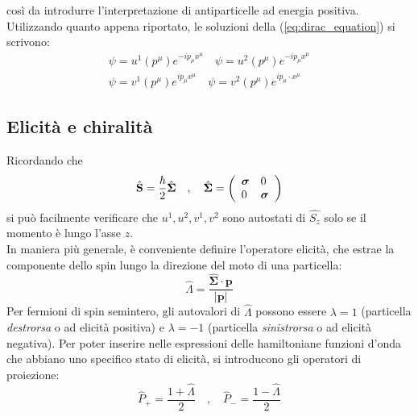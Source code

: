 \documentclass{subnucbo}
\begin{document}
così da introdurre l'interpretazione di antiparticelle ad energia positiva. Utilizzando quanto appena riportato, le soluzioni della (\ref{eq:dirac_equation}) si scrivono:
\begin{equation}
        \begin{align}
                \psi = u ^ { 1 } \left( p ^ { \mu } \right) e ^ { - i p_{\mu} x^{\mu} } \quad \psi = u ^ { 2 } \left( p ^ { \mu } \right) e ^ { - i p_{\mu} x^{\mu} } \\ \psi = v ^ { 1 } \left( p ^ { \mu } \right) e ^ {  i p_{\mu}  x^{\mu} } \quad \psi = v ^ { 2 } \left( p ^ { \mu } \right) e ^ {  i p_{\mu} \cdot x^{\mu} }
        \end{align}
        \label{eq:u1u2v1v2}
\end{equation}

\subsection{Elicità e chiralità}
Ricordando che
\begin{equation}
        \hat{\mathbf { S } } = \frac { \hbar } { 2 } \hat{\mathbf { \Sigma } } \quad , \quad \hat{\mathbf { \Sigma } } = \left( \begin{array} { l l } { \boldsymbol{\sigma }} & { 0 } \\ { 0 } & { \boldsymbol{\sigma} } \end{array} \right)
\end{equation}
si può facilmente verificare che $u^{1}, u^{2}, v^{1}, v^{2}$ sono autostati di $\hat { S _ { z } }$ solo se il momento è lungo l'asse $z$. \\
In maniera più generale, è conveniente definire l'operatore elicità, che estrae la componente dello spin lungo la direzione del moto di una particella:
\begin{equation}
        \hat { \Lambda }  = \frac { \hat { \mathbf { \Sigma } } \cdot \mathbf{p} } { |\mathbf{p}| }
        \label{eq:helicity}
\end{equation}
Per fermioni di spin semintero, gli autovalori di $\hat{\Lambda}$ possono essere $\lambda=1$ (particella \textit{destrorsa} o ad elicità positiva) e $\lambda=-1$ (particella \textit{sinistrorsa} o ad elicità negativa). Per poter inserire nelle espressioni delle hamiltoniane funzioni d'onda che abbiano uno specifico stato di elicità, si introducono gli operatori di proiezione:
\begin{equation}
        \hat { P } _ { + } = \frac { 1 + \hat { \Lambda } } { 2 } \quad , \quad \hat { P }_{-} = \frac { 1 - \hat { \Lambda } } { 2 }
        \label{eq:projection_operators}
\end{equation}
\end{document}
